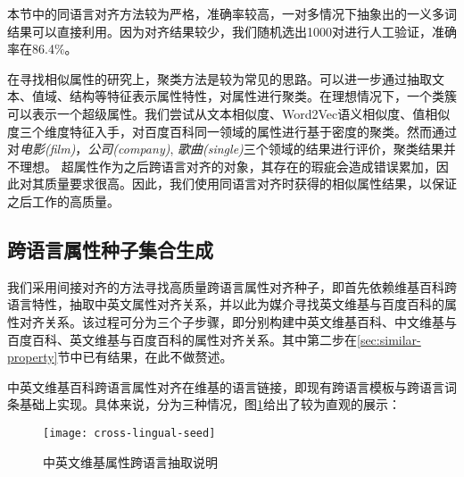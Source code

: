 本节中的同语言对齐方法较为严格，准确率较高，一对多情况下抽象出的一义多词结果可以直接利用。因为对齐结果较少，我们随机选出1000对进行人工验证，准确率在86.4\%。

在寻找相似属性的研究上，聚类方法是较为常见的思路。可以进一步通过抽取文本、值域、结构等特征表示属性特性，对属性进行聚类。在理想情况下，一个类簇可以表示一个超级属性。我们尝试从文本相似度、Word2Vec语义相似度、值相似度三个维度特征入手，对百度百科同一领域的属性进行基于密度的聚类。然而通过对\textit{电影(film)}，\textit{公司(company)}, \textit{歌曲(single)}三个领域的结果进行评价，聚类结果并不理想。
超属性作为之后跨语言对齐的对象，其存在的瑕疵会造成错误累加，因此对其质量要求很高。因此，我们使用同语言对齐时获得的相似属性结果，以保证之后工作的高质量。

\subsection{跨语言属性种子集合生成}
\label{sec:cross-lingual-seed}
我们采用间接对齐的方法寻找高质量跨语言属性对齐种子，即首先依赖维基百科跨语言特性，抽取中英文属性对齐关系，并以此为媒介寻找英文维基与百度百科的属性对齐关系。该过程可分为三个子步骤，即分别构建中英文维基百科、中文维基与百度百科、英文维基与百度百科的属性对齐关系。其中第二步在\ref{sec:similar-property}节中已有结果，在此不做赘述。

{\heiti 中英文维基百科跨语言属性对齐}在维基的语言链接，即现有跨语言模板与跨语言词条基础上实现。具体来说，分为三种情况，图\ref{fig:cross-lingual-seed}给出了较为直观的展示：

\begin{figure}[h]
  \centering
    \texttt{[image: cross-lingual-seed]}
  \caption{中英文维基属性跨语言抽取说明}
  \label{fig:cross-lingual-seed}
\end{figure}

